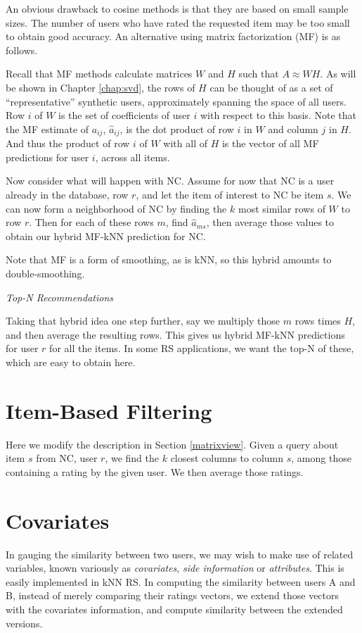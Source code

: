 An obvious drawback to cosine methods is that they are based on small
sample sizes.  The number of users who have rated the requested item may
be too small to obtain good accuracy.  An alternative using matrix
factorization (MF) is as follows.

Recall that MF methods calculate matrices $W$ and $H$ such that $A
\approx WH$.  As will be shown in Chapter \ref{chap:svd}, the rows of
$H$ can be thought of as a set of ``representative'' synthetic users,
approximately spanning the space of all users.  Row $i$ of $W$ is the
set of coefficients of user $i$ with respect to this basis.  Note that
the MF estimate of $a_{ij}$, $\widehat{a}_{ij}$, is the dot product of
row $i$ in $W$ and column $j$ in $H$.  And thus the product of row $i$
of $W$ with all of $H$ is the vector of all MF  predictions for user $i$,
across all items.

Now consider what will happen with NC.  Assume for now that NC is a user
already in the database, row $r$,  and let the item of interest to NC be
item $s$.  We can now form a neighborhood of NC by finding the $k$ most
similar rows of $W$ to row $r$.  Then for each of these rows $m$, find
$\widehat{a}_{ms}$, then average those values to obtain our hybrid
MF-kNN prediction for NC. 

Note that MF is a form of smoothing, as is kNN, so this hybrid amounts
to double-smoothing.  

\textit{Top-N Recommendations}

Taking that hybrid idea one step further, say we multiply those $m$ rows
times $H$, and then average the resulting rows.  This gives us hybrid
MF-kNN predictions for user $r$ for all the items.  In some RS
applications, we want the top-N of these, which are easy to obtain here.

\section{Item-Based Filtering}

Here we modify the description in Section \ref{matrixview}.  Given a
query about item $s$ from NC, user $r$, we find the $k$ closest columns
to column $s$, among those containing a rating by the given user.  We
then average those ratings.

\section{Covariates}

In gauging the similarity between two users, we may wish to make use of
related variables, known variously as \textit{covariates}, \textit{side
information} or \textit{attributes}.  This is easily implemented in kNN
RS.  In computing the similarity between users A and B, instead of
merely comparing their ratings vectors, we extend those vectors with the
covariates information, and compute similarity between the extended
versions.

